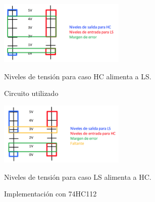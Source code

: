 \begin{figure}[H]
\begin{center}
  \begin{minipage}[b]{0.4\textwidth}
  	\begin{center}
  		\includegraphics[width=6cm]{ejercicio2/HC-LS}
    \caption{Niveles de tensi\'on para caso HC alimenta a LS.} %
  	\end{center}
  \caption{Circuito utilizado}
  \label{7_fig1}
  \end{minipage}
  \begin{minipage}[b]{0.4\textwidth}
    \begin{center}
  		\includegraphics[width=6cm]{ejercicio2/LS-HC}
    \caption{Niveles de tensi\'on para caso LS alimenta a HC.} %
	\end{center}
  \caption{Implementaci\'on con 74HC112}
  \label{7_fig2}
 \end{minipage}
\end{center}
\end{figure}


